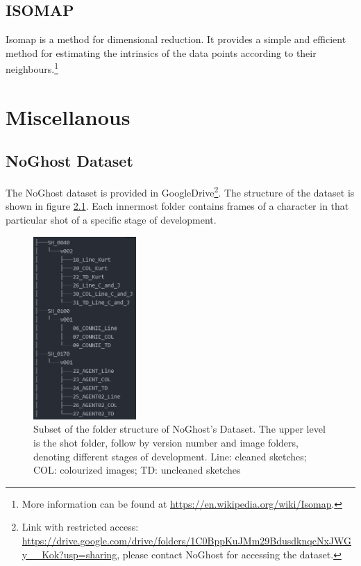 \section{ISOMAP}
\label{app:stat:isomap}
Isomap is a method for dimensional reduction. It provides a simple and efficient method for estimating the intrinsics of the data points according to their neighbours.\footnote{More information can be found at \url{https://en.wikipedia.org/wiki/Isomap}.}


\chapter{Miscellanous}

\section{NoGhost Dataset}
\label{app:misc:noghostdata}
The NoGhost dataset is provided in GoogleDrive\footnote{Link with restricted access: \url{https://drive.google.com/drive/folders/1C0BppKuJMm29BdusdknqcNxJWGy__Kok?usp=sharing}, please contact NoGhost for accessing the dataset.}. The structure of the dataset is shown in figure \ref{fig:noghost_dataset_structure}. Each innermost folder contains  frames of a character in that particular shot of a specific stage of development.
\begin{figure}
    \centering
    \includegraphics[width=0.35\textwidth]{images/appendix/noghost_dataset_structure.png}
    \caption[Subset of the folder structure of NoGhost's Dataset.]{Subset of the folder structure of NoGhost's Dataset. The upper level is the shot folder, follow by version number and image folders, denoting different stages of development. Line: cleaned sketches; COL: colourized images; TD: uncleaned sketches}
    \label{fig:noghost_dataset_structure}
\end{figure}

